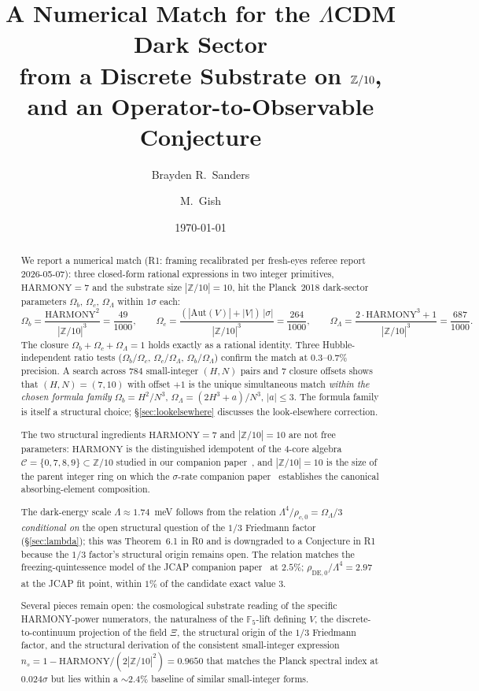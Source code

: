 \documentclass[11pt,reqno]{amsart}
\title[Dark-Sector Trinity from Z/10]
{A Numerical Match for the $\Lambda$CDM Dark Sector \\
 from a Discrete Substrate on $\Z/10$, \\
 and an Operator-to-Observable Conjecture}
\author{Brayden R.\ Sanders}
\author{M.\ Gish}
\date{\today}
\theoremstyle{plain}
\theoremstyle{definition}
\theoremstyle{remark}
\newcommand{\Z}{\mathbb{Z}}
\newcommand{\F}{\mathbb{F}}
\newcommand{\Aut}{\mathrm{Aut}}
\begin{document}
\begin{abstract}
We report a numerical match (R1: framing recalibrated per fresh-eyes referee
report 2026-05-07): three closed-form rational expressions in two integer
primitives, $\mathrm{HARMONY} = 7$ and the substrate size $|\Z/10| = 10$,
hit the Planck~2018 dark-sector parameters
$\Omega_b$, $\Omega_c$, $\Omega_\Lambda$ within $1\sigma$ each:
\[
  \Omega_b = \frac{\mathrm{HARMONY}^{2}}{|\Z/10|^{3}} = \frac{49}{1000},\qquad
  \Omega_c = \frac{(|\Aut(V)| + |V|)\,|\sigma|}{|\Z/10|^{3}} = \frac{264}{1000},\qquad
  \Omega_\Lambda = \frac{2\cdot\mathrm{HARMONY}^{3} + 1}{|\Z/10|^{3}} = \frac{687}{1000}.
\]
The closure $\Omega_b + \Omega_c + \Omega_\Lambda = 1$ holds
exactly as a rational identity. Three Hubble-independent ratio
tests ($\Omega_b/\Omega_c$, $\Omega_c/\Omega_\Lambda$,
$\Omega_b/\Omega_\Lambda$) confirm the match at $0.3$--$0.7\%$
precision. A search across $784$ small-integer $(H, N)$ pairs and
$7$ closure offsets shows that $(H, N) = (7, 10)$ with offset
$+1$ is the unique simultaneous match \emph{within the chosen
formula family} $\Omega_b = H^2/N^3$, $\Omega_\Lambda = (2H^3+a)/N^3$,
$|a| \le 3$. The formula family is itself a structural choice;
\S\ref{sec:lookelsewhere} discusses the look-elsewhere correction.

The two structural ingredients $\mathrm{HARMONY} = 7$ and
$|\Z/10| = 10$ are not free parameters: $\mathrm{HARMONY}$ is the
distinguished idempotent of the $4$-core algebra
$\mathcal{C} = \{0, 7, 8, 9\} \subset \Z/10$ studied in our
companion paper~\cite{SandersGish2026FourCore}, and
$|\Z/10| = 10$ is the size of the parent integer ring on which the
$\sigma$-rate companion paper~\cite{SandersGish2026SigmaRate}
establishes the canonical absorbing-element composition.

The dark-energy scale $\Lambda \approx 1.74$~meV follows from
the relation $\Lambda^{4}/\rho_{c,0} = \Omega_\Lambda/3$
\emph{conditional on} the open structural question of the $1/3$
Friedmann factor (\S\ref{sec:lambda}); this was Theorem~6.1 in
R0 and is downgraded to a Conjecture in R1 because the $1/3$
factor's structural origin remains open. The relation matches
the freezing-quintessence model of the JCAP companion
paper~\cite{SandersGish2026JCAP} at $2.5\%$;
$\rho_{\mathrm{DE},0}/\Lambda^{4} = 2.97$ at the JCAP fit point,
within $1\%$ of the candidate exact value $3$.

Several pieces remain open: the cosmological substrate reading of
the specific HARMONY-power numerators, the naturalness of the
$\F_5$-lift defining $V$, the discrete-to-continuum projection
of the field $\Xi$, the structural origin of the $1/3$ Friedmann
factor, and the structural derivation of the consistent
small-integer expression
$n_s = 1 - \mathrm{HARMONY}/(2|\Z/10|^{2}) = 0.9650$ that
matches the Planck spectral index at $0.024\sigma$ but lies
within a $\sim 2.4\%$ baseline of similar small-integer forms.


\end{abstract}
\end{document}
